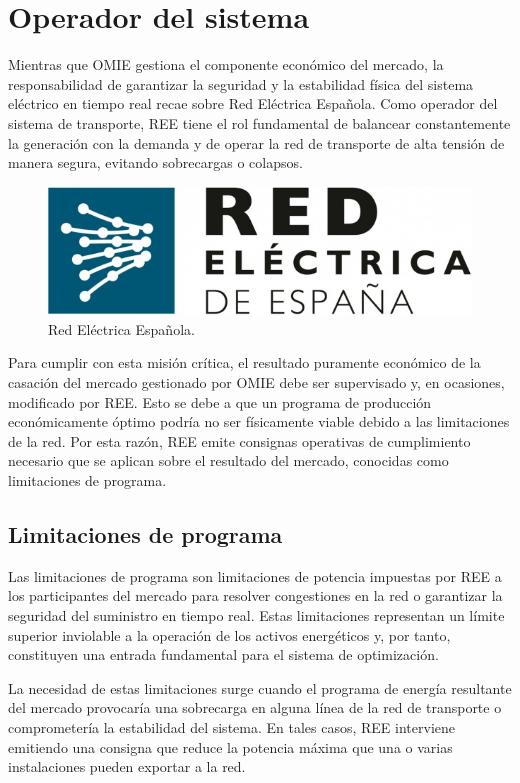 \section{Operador del sistema}
\label{makereference4.2}

Mientras que OMIE gestiona el componente económico del mercado, la responsabilidad de garantizar la seguridad y la estabilidad física del sistema eléctrico en tiempo real recae sobre Red Eléctrica Española. Como operador del sistema de transporte, REE tiene el rol fundamental de balancear constantemente la generación con la demanda y de operar la red de transporte de alta tensión de manera segura, evitando sobrecargas o colapsos.

\begin{figure}
  \centering
  \includegraphics[width=0.5\linewidth]{figures/ree.jpg}
  \caption{Red Eléctrica Española.}
  \label{fig:ree}
\end{figure}

Para cumplir con esta misión crítica, el resultado puramente económico de la casación del mercado gestionado por OMIE debe ser supervisado y, en ocasiones, modificado por REE. Esto se debe a que un programa de producción económicamente óptimo podría no ser físicamente viable debido a las limitaciones de la red. Por esta razón, REE emite consignas operativas de cumplimiento necesario que se aplican sobre el resultado del mercado, conocidas como limitaciones de programa.

\subsection{Limitaciones de programa}
\label{makereference4.2.1}

Las limitaciones de programa son limitaciones de potencia impuestas por REE a los participantes del mercado para resolver congestiones en la red o garantizar la seguridad del suministro en tiempo real. Estas limitaciones representan un límite superior inviolable a la operación de los activos energéticos y, por tanto, constituyen una entrada fundamental para el sistema de optimización.

La necesidad de estas limitaciones surge cuando el programa de energía resultante del mercado provocaría una sobrecarga en alguna línea de la red de transporte o comprometería la estabilidad del sistema. En tales casos, REE interviene emitiendo una consigna que reduce la potencia máxima que una o varias instalaciones pueden exportar a la red.

